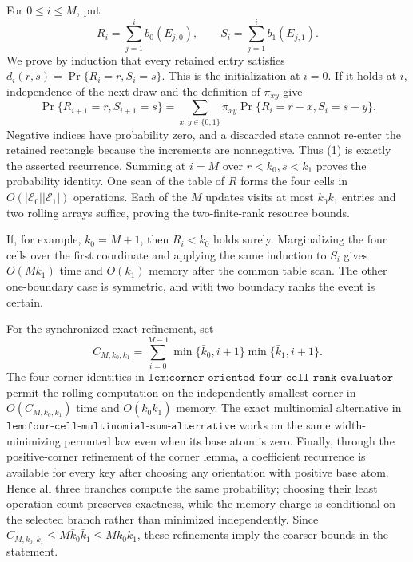 For \(0\le i\le M\), put
\[
R_i=\sum_{j=1}^i b_0(E_{j,0}),\qquad S_i=\sum_{j=1}^i b_1(E_{j,1}).
\]
We prove by induction that every retained entry satisfies \(d_i(r,s)=\Pr\{R_i=r,S_i=s\}\). This is the initialization at \(i=0\). If it holds at \(i\), independence of the next draw and the definition of \(\pi_{xy}\) give
\[
\Pr\{R_{i+1}=r,S_{i+1}=s\}=\sum_{x,y\in\{0,1\}}\pi_{xy}\Pr\{R_i=r-x,S_i=s-y\}.
\tag{1}
\]
Negative indices have probability zero, and a discarded state cannot re-enter the retained rectangle because the increments are nonnegative. Thus (1) is exactly the asserted recurrence. Summing at \(i=M\) over \(r<k_0,s<k_1\) proves the probability identity. One scan of the table of \(R\) forms the four cells in \(O(|\mathscr E_0||\mathscr E_1|)\) operations. Each of the \(M\) updates visits at most \(k_0k_1\) entries and two rolling arrays suffice, proving the two-finite-rank resource bounds.

If, for example, \(k_0=M+1\), then \(R_i<k_0\) holds surely. Marginalizing the four cells over the first coordinate and applying the same induction to \(S_i\) gives \(O(Mk_1)\) time and \(O(k_1)\) memory after the common table scan. The other one-boundary case is symmetric, and with two boundary ranks the event is certain.

For the synchronized exact refinement, set
\[
C_{M,k_0,k_1}=\sum_{i=0}^{M-1}\min\{\bar k_0,i+1\}\min\{\bar k_1,i+1\}.
\]
The four corner identities in \(\texttt{lem:corner-oriented-four-cell-rank-evaluator}\) permit the rolling computation on the independently smallest corner in \(O(C_{M,k_0,k_1})\) time and \(O(\bar k_0\bar k_1)\) memory. The exact multinomial alternative in \(\texttt{lem:four-cell-multinomial-sum-alternative}\) works on the same width-minimizing permuted law even when its base atom is zero. Finally, through the positive-corner refinement of the corner lemma, a coefficient recurrence is available for every key after choosing any orientation with positive base atom. Hence all three branches compute the same probability; choosing their least operation count preserves exactness, while the memory charge is conditional on the selected branch rather than minimized independently. Since \(C_{M,k_0,k_1}\le M\bar k_0\bar k_1\le Mk_0k_1\), these refinements imply the coarser bounds in the statement.